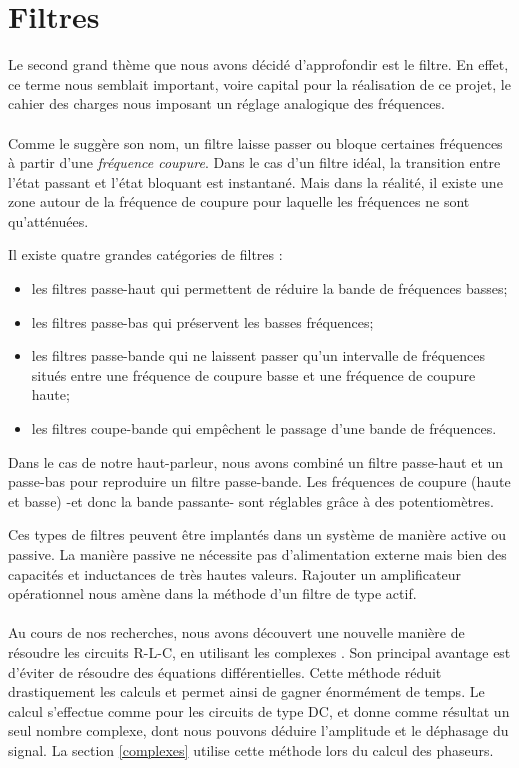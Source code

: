 \section{Filtres}
Le second grand thème que nous avons décidé d'approfondir est le filtre. En effet, ce terme nous semblait 
important, voire capital pour la réalisation de ce projet, le cahier des charges nous imposant un réglage 
analogique des fréquences.

\paragraph{}
Comme le suggère son nom, un filtre laisse passer ou bloque certaines fréquences à partir d'une \emph{fréquence coupure}. Dans le cas d'un filtre idéal, la transition entre l'état passant et l'état bloquant est instantané. Mais dans la réalité, il existe une zone autour de la fréquence de coupure pour laquelle les fréquences ne sont qu'atténuées. 

Il existe quatre grandes catégories de filtres \cite{Kularatna} : 
\begin{itemize}
\item les filtres passe-haut qui permettent de réduire la bande de fréquences basses;
\item les filtres passe-bas qui préservent les basses fréquences;
\item les filtres passe-bande qui ne laissent passer qu'un intervalle de fréquences situés entre une fréquence de coupure basse et une fréquence de coupure haute;
\item les filtres coupe-bande qui empêchent le passage d'une bande de fréquences.
\end{itemize}
Dans le cas de notre haut-parleur, nous avons combiné un filtre passe-haut et un passe-bas pour reproduire un filtre passe-bande. Les fréquences de coupure (haute et basse) -et donc la bande passante- sont réglables grâce à des potentiomètres.

Ces types de filtres peuvent être implantés dans un système de manière active ou passive. La manière passive ne nécessite pas d'alimentation externe mais bien des 
capacités et inductances de très hautes valeurs. Rajouter un amplificateur opérationnel nous amène dans la méthode d'un filtre de type actif. \cite{Kularatna}

\paragraph{}
Au cours de nos recherches, nous avons découvert une nouvelle manière de résoudre les circuits R-L-C, en utilisant les 
complexes \cite{Irwin}. Son principal avantage est d'éviter de résoudre des équations différentielles. Cette méthode réduit drastiquement les calculs et permet ainsi de gagner énormément de temps. Le calcul s'effectue comme pour les circuits de type DC, et donne comme résultat un seul nombre complexe, dont nous pouvons déduire l'amplitude et le déphasage du signal.
La section \ref{complexes} utilise cette méthode lors du calcul des phaseurs. 
